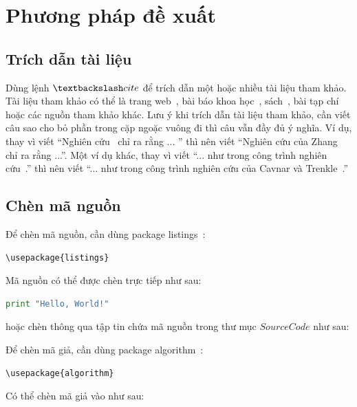 \chapter{Phương pháp đề xuất}
\label{Chapter3}

\section{Trích dẫn tài liệu}

Dùng lệnh $\textbackslash cite$ để trích dẫn một hoặc nhiều tài liệu tham khảo. Tài liệu tham khảo có thể là trang web~\cite{Listings,HDLVThS}, bài báo khoa học~\cite{1994-Cavnar}, sách~\cite{1984-TeX-Knuth,2006-DDien,2006-NPTV}, bài tạp chí~\cite{1989-TED} hoặc các nguồn tham khảo khác. Lưu ý khi trích dẫn tài liệu tham khảo, cần viết câu sao cho bỏ phần trong cặp ngoặc vuông đi thì câu vẫn đầy đủ ý nghĩa. Ví dụ, thay vì viết ``Nghiên cứu~\cite{1989-TED} chỉ ra rằng ... '' thì nên viết ``Nghiên cứu của Zhang~\cite{1989-TED} chỉ ra rằng ...''. Một ví dụ khác, thay vì viết ``... như trong công trình nghiên cứu~\cite{1994-Cavnar}.'' thì nên viết ``... như trong công trình nghiên cứu của Cavnar và Trenkle~\cite{1994-Cavnar}.''

\section{Chèn mã nguồn}

Để chèn mã nguồn, cần dùng package listings~\cite{Listings}:

\begin{lstlisting}
\usepackage{listings}
\end{lstlisting}

Mã nguồn có thể được chèn trực tiếp như sau:

\begin{lstlisting}[language=Python]
print "Hello, World!"
\end{lstlisting}

hoặc chèn thông qua tập tin chứa mã nguồn trong thư mục $SourceCode$ như sau:



Để chèn mã giả, cần dùng package algorithm~\cite{Algorithm}:

\begin{lstlisting}
\usepackage{algorithm}
\end{lstlisting}

Có thể chèn mã giả vào như sau:

